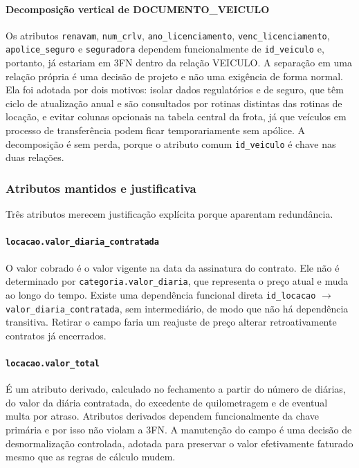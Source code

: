 \paragraph{Decomposi\c{c}\~ao vertical de DOCUMENTO\_VEICULO} Os atributos \texttt{renavam}, \texttt{num\_crlv}, \texttt{ano\_licenciamento}, \texttt{venc\_licenciamento}, \texttt{apolice\_seguro} e \texttt{seguradora} dependem funcionalmente de \texttt{id\_veiculo} e, portanto, j\'a estariam em 3FN dentro da rela\c{c}\~ao VEICULO. A separa\c{c}\~ao em uma rela\c{c}\~ao pr\'opria \'e uma decis\~ao de projeto e n\~ao uma exig\^encia de forma normal. Ela foi adotada por dois motivos: isolar dados regulat\'orios e de seguro, que t\^em ciclo de atualiza\c{c}\~ao anual e s\~ao consultados por rotinas distintas das rotinas de loca\c{c}\~ao, e evitar colunas opcionais na tabela central da frota, j\'a que ve\'iculos em processo de transfer\^encia podem ficar temporariamente sem ap\'olice. A decomposi\c{c}\~ao \'e sem perda, porque o atributo comum \texttt{id\_veiculo} \'e chave nas duas rela\c{c}\~oes.

\subsubsection{Atributos mantidos e justificativa}

Tr\^es atributos merecem justifica\c{c}\~ao expl\'icita porque aparentam redund\^ancia.

\paragraph{\texttt{locacao.valor\_diaria\_contratada}} O valor cobrado \'e o valor vigente na data da assinatura do contrato. Ele n\~ao \'e determinado por \texttt{categoria.valor\_diaria}, que representa o pre\c{c}o atual e muda ao longo do tempo. Existe uma depend\^encia funcional direta \texttt{id\_locacao} $\rightarrow$ \texttt{valor\_diaria\_contratada}, sem intermedi\'ario, de modo que n\~ao h\'a depend\^encia transitiva. Retirar o campo faria um reajuste de pre\c{c}o alterar retroativamente contratos j\'a encerrados.

\paragraph{\texttt{locacao.valor\_total}} \'E um atributo derivado, calculado no fechamento a partir do n\'umero de di\'arias, do valor da di\'aria contratada, do excedente de quilometragem e de eventual multa por atraso. Atributos derivados dependem funcionalmente da chave prim\'aria e por isso n\~ao violam a 3FN. A manuten\c{c}\~ao do campo \'e uma decis\~ao de desnormaliza\c{c}\~ao controlada, adotada para preservar o valor efetivamente faturado mesmo que as regras de c\'alculo mudem.

